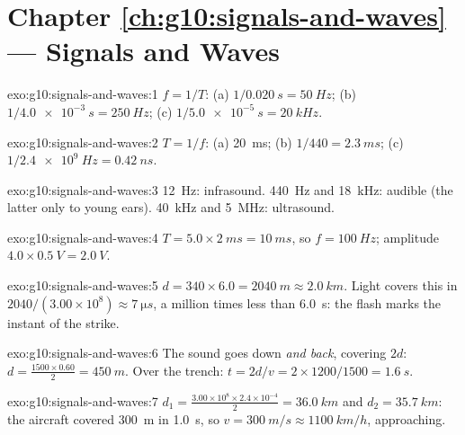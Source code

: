 \section*{Chapter \ref{ch:g10:signals-and-waves} --- Signals and Waves}

\begin{solution}{exo:g10:signals-and-waves:1}
$f = 1/T$: (a) $1/\qty{0.020}{s} = \qty{50}{Hz}$;
(b) $1/\qty{4.0e-3}{s} = \qty{250}{Hz}$;
(c) $1/\qty{5.0e-5}{s} = \qty{20}{kHz}$.
\end{solution}

\begin{solution}{exo:g10:signals-and-waves:2}
$T = 1/f$: (a) \qty{20}{ms}; (b) $1/440 = \qty{2.3}{ms}$;
(c) $1/\qty{2.4e9}{Hz} = \qty{0.42}{ns}$.
\end{solution}

\begin{solution}{exo:g10:signals-and-waves:3}
\qty{12}{Hz}: infrasound. \qty{440}{Hz} and \qty{18}{kHz}: audible (the
latter only to young ears). \qty{40}{kHz} and \qty{5}{MHz}: ultrasound.
\end{solution}

\begin{solution}{exo:g10:signals-and-waves:4}
$T = 5.0 \times \qty{2}{ms} = \qty{10}{ms}$, so $f = \qty{100}{Hz}$;
amplitude $4.0 \times \qty{0.5}{V} = \qty{2.0}{V}$.
\end{solution}

\begin{solution}{exo:g10:signals-and-waves:5}
$d = 340 \times 6.0 = \qty{2040}{m} \approx \qty{2.0}{km}$. Light covers
this in $2040/(3.00\times10^{8}) \approx \qty{7}{\micro s}$, a million
times less than \qty{6.0}{s}: the flash marks the instant of the strike.
\end{solution}

\begin{solution}{exo:g10:signals-and-waves:6}
The sound goes down \emph{and back}, covering $2d$:
$d = \frac{1500 \times 0.60}{2} = \qty{450}{m}$. Over the trench:
$t = 2d/v = 2 \times 1200/1500 = \qty{1.6}{s}$.
\end{solution}

\begin{solution}{exo:g10:signals-and-waves:7}
$d_1 = \frac{3.00\times10^{8} \times 2.4\times10^{-4}}{2} =
\qty{36.0}{km}$ and $d_2 = \qty{35.7}{km}$: the aircraft covered
\qty{300}{m} in \qty{1.0}{s}, so $v = \qty{300}{m/s} \approx
\qty{1100}{km/h}$, approaching.
\end{solution}

